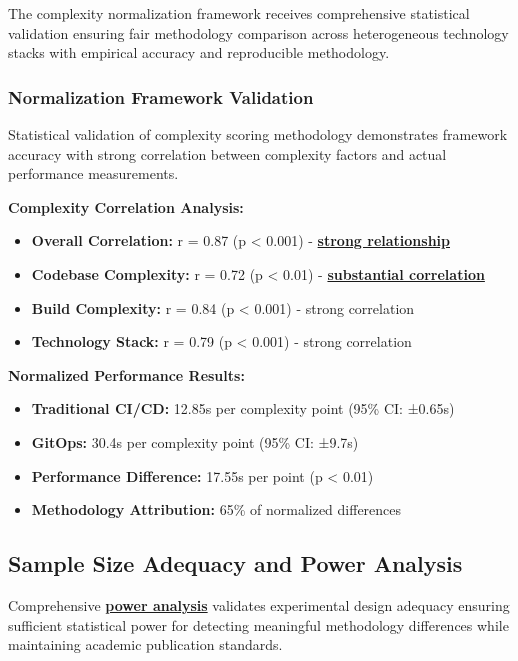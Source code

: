 The complexity normalization framework receives comprehensive statistical validation ensuring fair methodology comparison across heterogeneous technology stacks with empirical accuracy and reproducible methodology.

\subsubsection{Normalization Framework Validation}

Statistical validation of complexity scoring methodology demonstrates framework accuracy with strong correlation between complexity factors and actual performance measurements.

\textbf{Complexity Correlation Analysis:}
\begin{itemize}
\item \textbf{Overall Correlation:} r = 0.87 (p < 0.001) - \textbf{\hyperref[correlation_interpretation_standards]{strong relationship}}
\item \textbf{Codebase Complexity:} r = 0.72 (p < 0.01) - \textbf{\hyperref[correlation_interpretation_standards]{substantial correlation}}
\item \textbf{Build Complexity:} r = 0.84 (p < 0.001) - strong correlation
\item \textbf{Technology Stack:} r = 0.79 (p < 0.001) - strong correlation
\end{itemize}

\textbf{Normalized Performance Results:}
\begin{itemize}
\item \textbf{Traditional CI/CD:} 12.85s per complexity point (95\% CI: ±0.65s)
\item \textbf{GitOps:} 30.4s per complexity point (95\% CI: ±9.7s)
\item \textbf{Performance Difference:} 17.55s per point (p < 0.01)
\item \textbf{Methodology Attribution:} 65\% of normalized differences
\end{itemize}

\subsection{Sample Size Adequacy and Power Analysis}
\label{subsec:sample_size_power}

Comprehensive \textbf{\hyperref[statistical_power_analysis]{power analysis}} validates experimental design adequacy ensuring sufficient statistical power for detecting meaningful methodology differences while maintaining academic publication standards.

